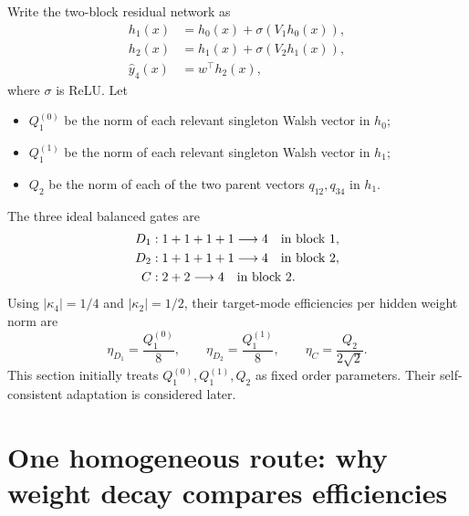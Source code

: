 \documentclass[11pt]{article}
\newcommand{\eone}{\eta_{D_1}}
\newcommand{\etwo}{\eta_{D_2}}
\newcommand{\ecomp}{\eta_C}
\begin{document}
Write the two-block residual network as
\begin{align}
h_1(x)&=h_0(x)+\sigma(V_1h_0(x)),\\
h_2(x)&=h_1(x)+\sigma(V_2h_1(x)),\\
\widehat y_4(x)&=w^\top h_2(x),
\end{align}
where \(\sigma\) is ReLU.  Let
\begin{itemize}
    \item \(Q_1^{(0)}\) be the norm of each relevant singleton Walsh vector in \(h_0\);
    \item \(Q_1^{(1)}\) be the norm of each relevant singleton Walsh vector in \(h_1\);
    \item \(Q_2\) be the norm of each of the two parent vectors \(q_{12},q_{34}\) in \(h_1\).
\end{itemize}
The three ideal balanced gates are
\begin{align}
D_1 &: 1+1+1+1\longrightarrow4 \quad\hbox{in block 1},\\
D_2 &: 1+1+1+1\longrightarrow4 \quad\hbox{in block 2},\\
C &: 2+2\longrightarrow4 \quad\hbox{in block 2}.
\end{align}
Using \(|\kappa_4|=1/4\) and \(|\kappa_2|=1/2\), their target-mode efficiencies per hidden
weight norm are
\begin{equation}
\boxed{
\eone=\frac{Q_1^{(0)}}8,
\qquad
\etwo=\frac{Q_1^{(1)}}8,
\qquad
\ecomp=\frac{Q_2}{2\sqrt2}.}
\label{eq:etas}
\end{equation}
This section initially treats \(Q_1^{(0)},Q_1^{(1)},Q_2\) as fixed order parameters.  Their
self-consistent adaptation is considered later.

\section{One homogeneous route: why weight decay compares efficiencies}
\end{document}
